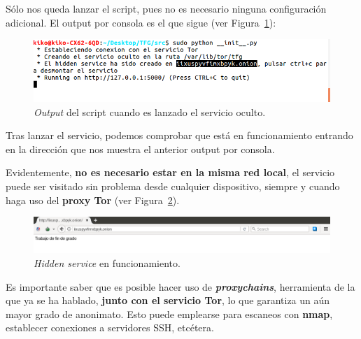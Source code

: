 Sólo nos queda lanzar el script, pues no es necesario ninguna configuración adicional. El output por consola es el que sigue (ver Figura~\ref{fig:StemOut}):

\begin{figure}[H]
	\centerline{
		\mbox{\includegraphics[width=5.00in]{images/hs_running.png}}
	}
	\caption{\textit{Output} del script cuando es lanzado el servicio oculto.}
	\label{fig:StemOut}
\end{figure}

Tras lanzar el servicio, podemos comprobar que está en funcionamiento entrando en la dirección que nos muestra el anterior output por consola. 

Evidentemente, \textbf{no es necesario estar en la misma red local}, el servicio puede ser visitado sin problema desde cualquier dispositivo, siempre y cuando haga uso del \textbf{proxy Tor} (ver Figura~\ref{fig:hiddenserviceonline}).

\begin{figure}[H]
	\centerline{
		\mbox{\includegraphics[width=5.00in]{images/hs_running2.png}}
	}
	\caption{\textit{Hidden service} en funcionamiento.}
	\label{fig:hiddenserviceonline}
\end{figure} 


Es importante saber que es posible hacer uso de \textbf{\textit{proxychains}}, herramienta de la que ya se ha hablado, \textbf{junto con el servicio Tor}, lo que garantiza un aún mayor grado de anonimato. Esto puede emplearse para escaneos con \textbf{nmap}, establecer conexiones a servidores SSH, etcétera.


